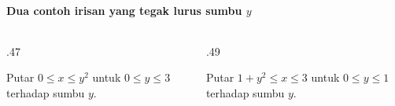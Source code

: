 \documentclass{../../kalkulus-ppt}
\begin{document}
\begin{frame}{\insertsection}
    \framesubtitle{Dua contoh irisan yang tegak lurus sumbu $y$}
    \begin{columns}[t,onlytextwidth]
        \begin{column}{.47\textwidth}
            \begin{contoh}
                Putar $0\le x\le y^2$ untuk $0\le y\le3$ terhadap sumbu $y$.
            \end{contoh}
        \end{column}
        \begin{column}{.49\textwidth}
            \begin{contoh}
                Putar $1+y^2\le x\le3$ untuk $0\le y\le1$ terhadap sumbu $y$.
            \end{contoh}
        \end{column}
    \end{columns}
\end{frame}
\end{document}
